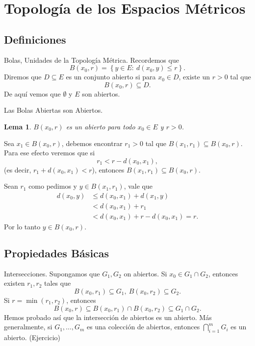 \documentclass[utf8]{beamer}
\theoremstyle{plain}
\newtheorem{Lem}{Lema}                 %
\theoremstyle{definition}
\theoremstyle{remark}
\numberwithin{equation}{section}
\begin{document}
\section{Topolog\'ia de los Espacios M\'etricos}

\subsection{Definiciones}

\begin{frame}{Bolas, Unidades de la Topolog\'ia M\'etrica.}
    Recordemos que 
    $$B(x_0,r)=\left\lbrace y\in E:\ d(x_0,y)\leq r\right\rbrace.$$
    Diremos que $D\subseteq E$ es un \alert{conjunto abierto} si para $x_0\in D$, existe un $r>0$ tal que 
    $$B(x_0,r)\subseteq D.$$
    De aqu\'i vemos que $\emptyset$ y $E$ son abiertos.
\end{frame}

\begin{frame}{Las Bolas Abiertas son Abiertos.}
    \begin{Lem}
        $B(x_0,r)$ es un abierto para todo $x_0\in E$ y $r>0$.
    \end{Lem}
        Sea $x_1\in B(x_0,r)$, debemos encontrar $r_1>0$ tal que $B(x_1,r_1)\subseteq B(x_0,r)$. Para ese efecto veremos que si 
        $$r_1< r-d(x_0,x_1),$$
        (es decir, $r_1+d(x_0,x_1)<r$), entonces $B(x_1,r_1)\subseteq B(x_0,r)$.\par 
        Sean $r_1$ como pedimos y $y\in B(x_1,r_1)$, vale que
        \begin{align*}
          d(x_0,y)&\leq d(x_0,x_1)+d(x_1,y)\\
          &< d(x_0,x_1)+r_1\\
          &< d(x_0,x_1)+r-d(x_0,x_1)=r.
        \end{align*}
        Por lo tanto $y\in B(x_0,r)$.
\end{frame}

\subsection{Propiedades B\'asicas}

\begin{frame}{Intersecciones.}
  Supongamos que $G_1,G_2$ on abiertos. Si $x_0\in G_1\cap G_2$, entonces existen $r_1,r_2$ tales que 
  $$B(x_0,r_1)\subseteq G_1,\ B(x_0,r_2)\subseteq G_2.$$
  Si $r=\min(r_1,r_2)$, entonces 
  $$B(x_0,r)\subseteq B(x_0,r_1)\cap B(x_0,r_2)\subseteq G_1\cap G_2.$$
  Hemos probado as\'i que la intersecci\'on de abiertos es un abierto. M\'as generalmente, si $G_1,\dots,G_m$ es una colecci\'on de abiertos, entonces $\bigcap_{i=1}^mG_i$ es un abierto. (\alert{Ejercicio})
\end{frame}
\end{document}
